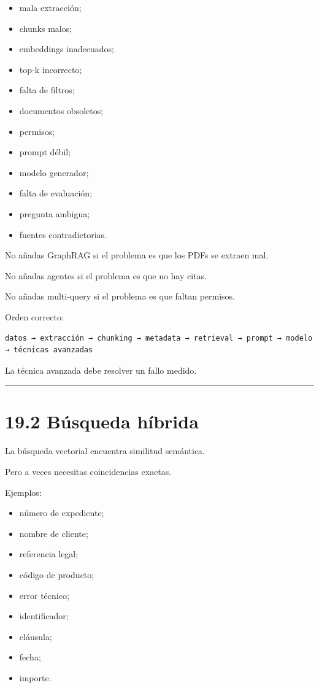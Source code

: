 \begin{itemize}
\tightlist
\item
  mala extracción;
\item
  chunks malos;
\item
  embeddings inadecuados;
\item
  top-k incorrecto;
\item
  falta de filtros;
\item
  documentos obsoletos;
\item
  permisos;
\item
  prompt débil;
\item
  modelo generador;
\item
  falta de evaluación;
\item
  pregunta ambigua;
\item
  fuentes contradictorias.
\end{itemize}

No añadas GraphRAG si el problema es que los PDFs se extraen mal.

No añadas agentes si el problema es que no hay citas.

No añadas multi-query si el problema es que faltan permisos.

Orden correcto:

\begin{lstlisting}
datos → extracción → chunking → metadata → retrieval → prompt → modelo → técnicas avanzadas
\end{lstlisting}

La técnica avanzada debe resolver un fallo medido.

\begin{center}\rule{0.5\linewidth}{0.5pt}\end{center}

\section{19.2 Búsqueda híbrida}\label{buxfasqueda-huxedbrida}

La búsqueda vectorial encuentra similitud semántica.

Pero a veces necesitas coincidencias exactas.

Ejemplos:

\begin{itemize}
\tightlist
\item
  número de expediente;
\item
  nombre de cliente;
\item
  referencia legal;
\item
  código de producto;
\item
  error técnico;
\item
  identificador;
\item
  cláusula;
\item
  fecha;
\item
  importe.
\end{itemize}

